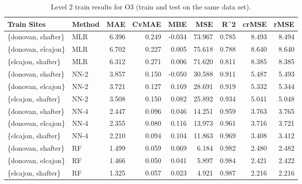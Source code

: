 \begin{table}[h]
\begin{tabular}{llrrrrrrr}
\toprule
 Train Sites & Method &   MAE &  CvMAE &       MBE &     MSE &   R\textasciicircum2 &  crMSE &   rMSE \\
\midrule
\{donovan, shafter\} & MLR & 6.396 & 0.249 & -0.034 & 73.967 & 0.785 & 8.493 & 8.494\\
\{donovan, elcajon\} & MLR & 6.702 & 0.227 & 0.005 & 75.618 & 0.788 & 8.640 & 8.640\\
\{elcajon, shafter\} & MLR & 6.312 & 0.271 & 0.006 & 71.620 & 0.811 & 8.385 & 8.385\\
\{donovan, shafter\} & NN-2 & 3.857 & 0.150 & -0.050 & 30.588 & 0.911 & 5.487 & 5.493\\
\{donovan, elcajon\} & NN-2 & 3.721 & 0.127 & 0.169 & 28.691 & 0.919 & 5.332 & 5.344\\
\{elcajon, shafter\} & NN-2 & 3.508 & 0.150 & 0.082 & 25.892 & 0.934 & 5.041 & 5.048\\
\{donovan, shafter\} & NN-4 & 2.447 & 0.096 & 0.046 & 14.251 & 0.959 & 3.763 & 3.765\\
\{donovan, elcajon\} & NN-4 & 2.355 & 0.080 & 0.116 & 13.973 & 0.961 & 3.716 & 3.721\\
\{elcajon, shafter\} & NN-4 & 2.210 & 0.094 & 0.104 & 11.863 & 0.969 & 3.408 & 3.412\\
\{donovan, shafter\} & RF & 1.499 & 0.059 & 0.069 & 6.184 & 0.982 & 2.480 & 2.482\\
\{donovan, elcajon\} & RF & 1.466 & 0.050 & 0.041 & 5.897 & 0.984 & 2.421 & 2.422\\
\{elcajon, shafter\} & RF & 1.325 & 0.057 & 0.023 & 4.921 & 0.987 & 2.216 & 2.216\\
\bottomrule
\end{tabular}
\caption{Level 2 train results for O3 (train and test on the same data set).}
\end{table}
